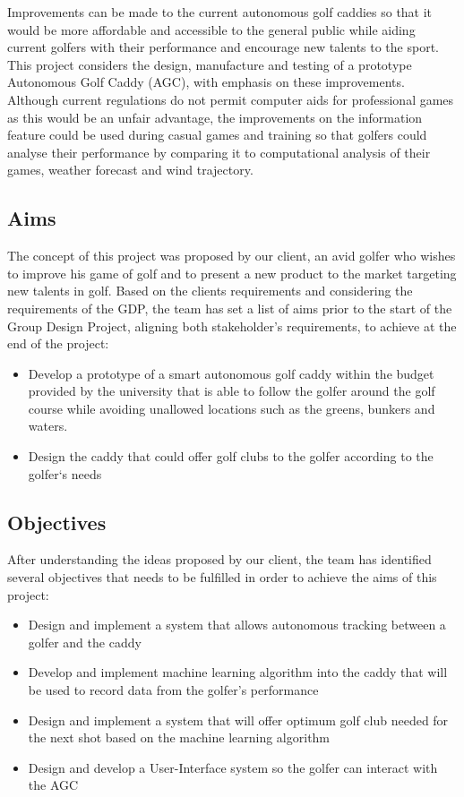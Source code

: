\documentclass[11pt,landscape]{article}
\begin{document}
\begin{multicols}{3}
Improvements can be made to the current autonomous golf caddies so that it would
be more affordable and accessible to the general public while aiding current
golfers with their performance and encourage new talents to the sport. This
project considers the design, manufacture and testing of a prototype Autonomous
Golf Caddy (AGC), with emphasis on these improvements. Although current
regulations do not permit computer aids for professional games as this would be
an unfair advantage, the improvements on the information feature could be used
during casual games and training so that golfers could analyse their performance
by comparing it to computational analysis of their games, weather forecast and
wind trajectory.  

\subsection{Aims}
The concept of this project was proposed by our client, an avid golfer who wishes
to improve his game of golf and to present a new product to the market
targeting new talents in golf. Based on the clients requirements and considering
the requirements of the GDP, the team has set a list of aims prior to the start
of the Group Design Project, aligning both stakeholder's requirements, to
achieve at the end of the project: 
\begin{itemize}
    \item Develop a prototype of a smart autonomous golf caddy within the budget
    provided by the university that is able to follow the golfer around the golf
    course while avoiding unallowed locations such as the greens, bunkers and
    waters. 
    \item Design the caddy that could offer golf clubs to the golfer according
    to the golfer`s needs 
\end{itemize}

\subsection{Objectives}
After understanding the ideas proposed by our client, the team has identified
several objectives that needs to be fulfilled in order to achieve the aims of
this project: 
\begin{itemize}
    \item Design and implement a system that allows autonomous tracking between
    a golfer and the caddy 
    \item Develop and implement machine learning algorithm into the caddy that
    will be used to record data from the golfer’s performance 
    \item Design and implement a system that will offer optimum golf club
    needed for the next shot based on the machine learning algorithm 
    \item Design and develop a User-Interface system so the golfer can interact
    with the AGC
\end{itemize}


\end{multicols}
\end{document}
